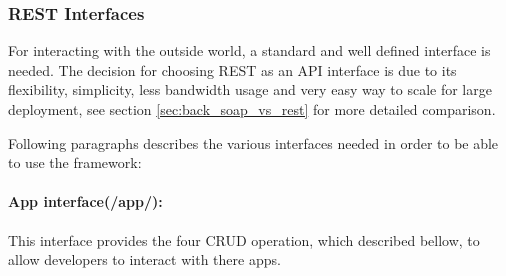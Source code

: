 \subsubsection{REST Interfaces} For interacting with the outside world, a standard and well defined interface is needed. The decision for choosing REST as an API interface is due to its flexibility, simplicity, less bandwidth usage and very easy way to scale for large deployment, see section \ref{sec:back_soap_vs_rest} for more detailed comparison.

Following paragraphs describes the various interfaces needed in order to be able to use the framework:

\paragraph{App interface(/app/):} This interface provides the four CRUD operation, which described bellow, to allow developers to interact with there apps.

